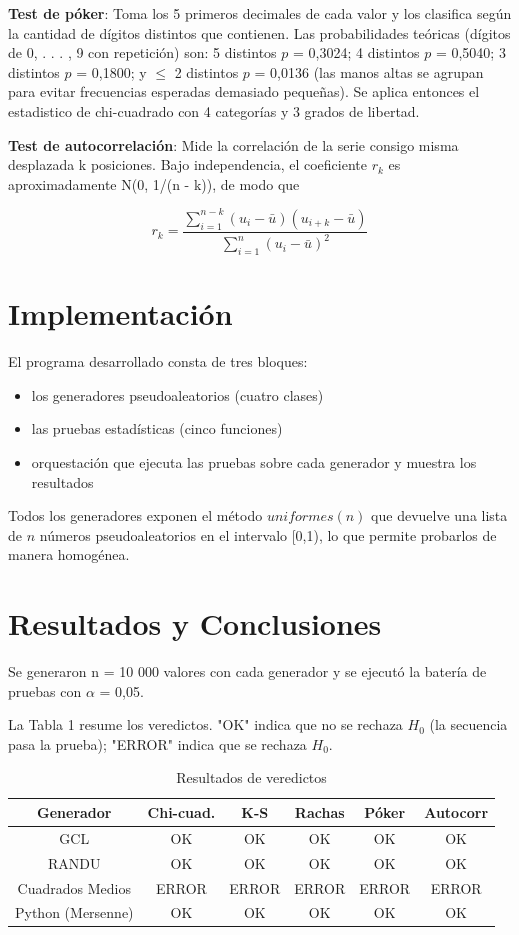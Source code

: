\documentclass{article}
\begin{document}
\textbf{Test de póker}: Toma los 5 primeros decimales de cada valor y los clasifica según la cantidad de dígitos distintos que contienen. Las probabilidades teóricas (dígitos de {0, . . . , 9} con repetición) son: 5 distintos $p$ = 0,3024; 4 distintos $p$ = 0,5040; 3 distintos $p$ = 0,1800; y \(\le \) 2 distintos $p$ = 0,0136 (las manos altas se agrupan para evitar frecuencias esperadas demasiado pequeñas). Se aplica entonces el estadistico de chi-cuadrado con 4 categorías y 3 grados de libertad.

\textbf{Test de autocorrelación}: Mide la correlación de la serie consigo misma desplazada k posiciones. Bajo independencia, el coeficiente $r_k$ es aproximadamente N(0, 1/(n - k)), de modo que

\begin{equation}
r_k = \frac{\sum_{i=1}^{n-k} (u_i - \bar{u})(u_{i+k} - \bar{u})}{\sum_{i=1}^n (u_i - \bar{u})^2}
\end{equation}

\section{Implementación}
El programa desarrollado consta de tres bloques:
\begin{itemize}
  \item los generadores pseudoaleatorios (cuatro clases)
  \item las pruebas estadísticas (cinco funciones)
  \item orquestación que ejecuta las pruebas sobre cada generador y muestra los resultados
\end{itemize}

Todos los generadores exponen el método $uniformes(n)$ que devuelve una lista de $n$ números pseudoaleatorios en el intervalo [0,1), lo que permite probarlos de manera homogénea.


\section{Resultados y Conclusiones}
Se generaron n = 10 000 valores con cada generador y se ejecutó la batería de pruebas con $\alpha$ = 0,05.

La Tabla 1 resume los veredictos. "OK" indica que no se rechaza $H_0$ (la secuencia pasa la prueba); "ERROR" indica que se rechaza $H_0$.

\begin{table}[H]
\begin{center}
\begin{tabular}{ c  c  c  c  c  c }
Generador & Chi-cuad. & K-S & Rachas & Póker & Autocorr \\
\hline
GCL & OK & OK & OK & OK & OK \\
RANDU & OK & OK & OK & OK & OK \\
Cuadrados Medios & ERROR & ERROR & ERROR & ERROR & ERROR \\
Python (Mersenne) & OK & OK & OK & OK & OK \\
\hline
\end{tabular}
\caption{Resultados de veredictos}
\end{center}
\end{table}
\end{document}
